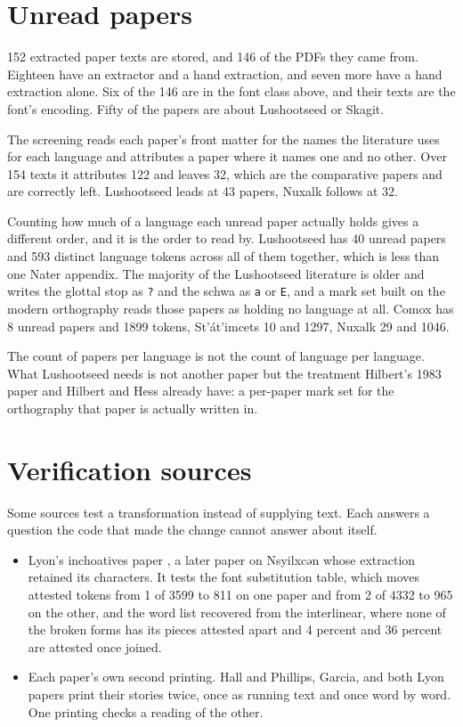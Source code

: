 \section{Unread papers}

152 extracted paper texts are stored, and 146 of the PDFs they came from. Eighteen have an extractor and a hand extraction, and seven more have a hand extraction alone. Six of the 146 are in the font class above, and their texts are the font's encoding. Fifty of the papers are about Lushootseed or Skagit.

The screening reads each paper's front matter for the names the literature uses for each language and attributes a paper where it names one and no other. Over 154 texts it attributes 122 and leaves 32, which are the comparative papers and are correctly left. Lushootseed leads at 43 papers, Nuxalk follows at 32.

Counting how much of a language each unread paper actually holds gives a different order, and it is the order to read by. Lushootseed has 40 unread papers and 593 distinct language tokens across all of them together, which is less than one Nater appendix. The majority of the Lushootseed literature is older and writes the glottal stop as \texttt{?} and the schwa as \texttt{a} or \texttt{E}, and a mark set built on the modern orthography reads those papers as holding no language at all. Comox has 8 unread papers and 1899 tokens, St'át'imcets 10 and 1297, Nuxalk 29 and 1046.

The count of papers per language is not the count of language per language. What Lushootseed needs is not another paper but the treatment Hilbert's 1983 paper and Hilbert and Hess already have: a per-paper mark set for the orthography that paper is actually written in.

\section{Verification sources}

Some sources test a transformation instead of supplying text. Each answers a question the code that made the change cannot answer about itself.

\begin{itemize}
\item Lyon's inchoatives paper \cite{src:Lyon-2025}, a later paper on Nsyilxcən whose extraction retained its characters. It tests the font substitution table, which moves attested tokens from 1 of 3599 to 811 on one paper and from 2 of 4332 to 965 on the other, and the word list recovered from the interlinear, where none of the broken forms has its pieces attested apart and 4 percent and 36 percent are attested once joined.
\item Each paper's own second printing. Hall and Phillips, Garcia, and both Lyon papers print their stories twice, once as running text and once word by word. One printing checks a reading of the other.
\end{itemize}

